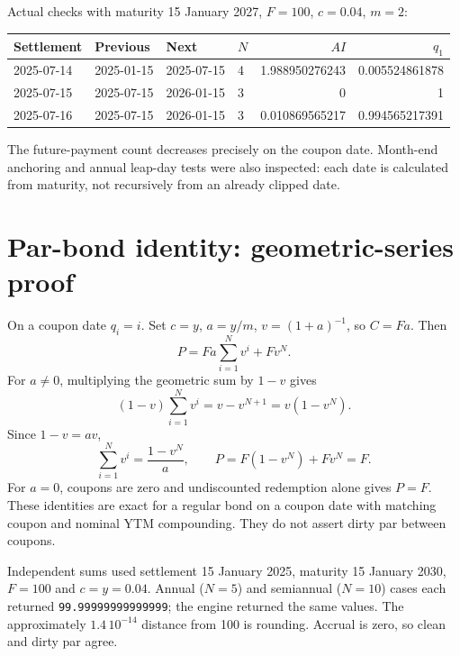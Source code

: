\documentclass[12pt,a4paper]{article}
\begin{document}
Actual checks with maturity 15 January 2027, $F=100$, $c=0.04$, $m=2$:
\begin{center}\small
\begin{tabular}{@{}llllrr@{}}
\toprule
Settlement & Previous & Next & $N$ & $AI$ & $q_1$\\
\midrule
2025-07-14 & 2025-01-15 & 2025-07-15 & 4 & 1.988950276243 & 0.005524861878\\
2025-07-15 & 2025-07-15 & 2026-01-15 & 3 & 0 & 1\\
2025-07-16 & 2025-07-15 & 2026-01-15 & 3 & 0.010869565217 & 0.994565217391\\
\bottomrule
\end{tabular}
\end{center}
The future-payment count decreases precisely on the coupon date.
Month-end anchoring and annual leap-day tests were also inspected: each
date is calculated from maturity, not recursively from an already clipped date.

\section{Par-bond identity: geometric-series proof}
On a coupon date $q_i=i$. Set $c=y$, $a=y/m$, $v=(1+a)^{-1}$, so $C=Fa$.
Then
\[
 P=Fa\sum_{i=1}^{N}v^i+Fv^N.
\]
For $a\ne0$, multiplying the geometric sum by $1-v$ gives
\[
 (1-v)\sum_{i=1}^{N}v^i=v-v^{N+1}=v(1-v^N).
\]
Since $1-v=av$,
\begin{equation}
 \sum_{i=1}^{N}v^i=\frac{1-v^N}{a},\qquad
 P=F(1-v^N)+Fv^N=F.
\end{equation}
For $a=0$, coupons are zero and undiscounted redemption alone gives $P=F$.
These identities are exact for a regular bond on a coupon date with matching
coupon and nominal YTM compounding. They do not assert dirty par between coupons.

Independent sums used settlement 15 January 2025, maturity 15 January 2030,
$F=100$ and $c=y=0.04$. Annual ($N=5$) and semiannual ($N=10$) cases each
returned \texttt{99.99999999999999}; the engine returned the same values.
The approximately $1.4\,10^{-14}$ distance from 100 is rounding. Accrual is
zero, so clean and dirty par agree.
\end{document}
